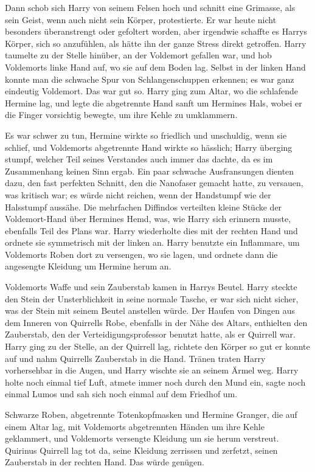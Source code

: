 Dann schob sich Harry von seinem Felsen hoch und schnitt eine Grimasse, als sein
Geist, wenn auch nicht sein Körper, protestierte. Er war heute nicht besonders
überanstrengt oder gefoltert worden, aber irgendwie schaffte es Harrys Körper,
sich so anzufühlen, als hätte ihn der ganze Stress direkt getroffen. Harry
taumelte zu der Stelle hinüber, an der Voldemort gefallen war, und hob
Voldemorts linke Hand auf, wo sie auf dem Boden lag. Selbst in der linken Hand
konnte man die schwache Spur von Schlangenschuppen erkennen; es war ganz
eindeutig Voldemort. Das war gut so. Harry ging zum Altar, wo die schlafende
Hermine lag, und legte die abgetrennte Hand sanft um Hermines Hals, wobei er die
Finger vorsichtig bewegte, um ihre Kehle zu umklammern.

Es war schwer zu tun, Hermine wirkte so friedlich und unschuldig, wenn sie
schlief, und Voldemorts abgetrennte Hand wirkte so hässlich; Harry überging
stumpf, welcher Teil seines Verstandes auch immer das dachte, da es im
Zusammenhang keinen Sinn ergab. Ein paar schwache Ausfransungen dienten dazu,
den fast perfekten Schnitt, den die Nanofaser gemacht hatte, zu versauen, was
kritisch war; es würde nicht reichen, wenn der Handstumpf wie der Halsstumpf
aussähe. Die mehrfachen Diffindos verteilten kleine Stücke der Voldemort-Hand
über Hermines Hemd, was, wie Harry sich erinnern musste, ebenfalls Teil des
Plans war. Harry wiederholte dies mit der rechten Hand und ordnete sie
symmetrisch mit der linken an. Harry benutzte ein Inflammare, um Voldemorts
Roben dort zu versengen, wo sie lagen, und ordnete dann die angesengte Kleidung
um Hermine herum an.

Voldemorts Waffe und sein Zauberstab kamen in Harrys Beutel. Harry steckte den
Stein der Unsterblichkeit in seine normale Tasche, er war sich nicht sicher, was
der Stein mit seinem Beutel anstellen würde. Der Haufen von Dingen aus dem
Inneren von Quirrells Robe, ebenfalls in der Nähe des Altars, enthielten den
Zauberstab, den der Verteidigungsprofessor benutzt hatte, als er Quirrell war.
Harry ging zu der Stelle, an der Quirrell lag, richtete den Körper so gut er
konnte auf und nahm Quirrells Zauberstab in die Hand. Tränen traten Harry
vorhersehbar in die Augen, und Harry wischte sie an seinem Ärmel weg. Harry
holte noch einmal tief Luft, atmete immer noch durch den Mund ein, sagte noch
einmal \glqq{}Lumos\grqq{} und sah sich noch einmal auf dem Friedhof um.

Schwarze Roben, abgetrennte Totenkopfmasken und Hermine Granger, die auf einem
Altar lag, mit Voldemorts abgetrennten Händen um ihre Kehle geklammert, und
Voldemorts versengte Kleidung um sie herum verstreut. Quirinus Quirrell lag tot
da, seine Kleidung zerrissen und zerfetzt, seinen Zauberstab in der rechten
Hand. Das würde genügen.


